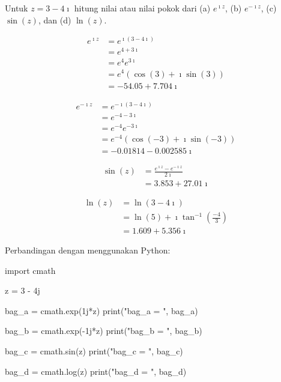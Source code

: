 \begin{contoh}
Untuk $z = 3 - 4\imath$ hitung nilai atau nilai pokok dari (a) $e^{\imath z}$,
(b) $e^{-\imath z}$, (c) $\sin(z)$, dan (d) $\ln(z)$.

\begin{align*}
e^{\imath z} & = e^{\imath (3 - 4\imath)} \\
             & = e^{4 + 3\imath} \\
             & = e^{4} e^{3\imath} \\
             & = e^{4}(\cos(3) + \imath \sin(3)) \\
             & = -54.05 + 7.704\imath
\end{align*}

\begin{align*}
e^{-\imath z} & = e^{-\imath (3 - 4\imath)} \\
             & = e^{-4 - 3\imath} \\
             & = e^{-4} e^{-3\imath} \\
             & = e^{-4}(\cos(-3) + \imath \sin(-3)) \\
             & = -0.01814 - 0.002585\imath
\end{align*}


\begin{align*}
\sin(z) & = \frac{e^{\imath z} - e^{-\imath z}}{2\imath} \\
        & = 3.853 + 27.01\imath
\end{align*}


\begin{align*}
\ln(z) & = \ln(3 - 4\imath) \\
       & = \ln(5) + \imath \tan^{-1}\left(\frac{-4}{3}\right) \\
       & = 1.609 + 5.356\imath
\end{align*}

\end{contoh}

Perbandingan dengan menggunakan Python:
\begin{pythoncode}
import cmath

z = 3 - 4j
    
bag_a = cmath.exp(1j*z)
print("bag_a = ", bag_a)

bag_b = cmath.exp(-1j*z)
print("bag_b = ", bag_b)

bag_c = cmath.sin(z)
print("bag_c = ", bag_c)

bag_d = cmath.log(z)
print("bag_d = ", bag_d)    
\end{pythoncode}

